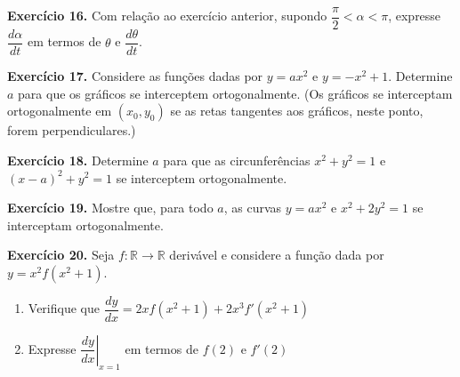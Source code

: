 \documentclass[12pt,a4paper]{article}
\begin{document}
\begin{center}
\end{center}

\vspace{0.5cm}
\noindent\textbf{Exercício 16.}
Com relação ao exercício anterior, supondo $\dfrac{\pi}{2} < \alpha < \pi$, expresse $\dfrac{d\alpha}{dt}$ em termos de $\theta$ e $\dfrac{d\theta}{dt}$.

\vspace{0.5cm}
\noindent\textbf{Exercício 17.}
Considere as funções dadas por $y = ax^2$ e $y = -x^2 + 1$. Determine $a$ para que os gráficos se interceptem ortogonalmente. (Os gráficos se interceptam ortogonalmente em $(x_0, y_0)$ se as retas tangentes aos gráficos, neste ponto, forem perpendiculares.)

\vspace{0.5cm}
\noindent\textbf{Exercício 18.}
Determine $a$ para que as circunferências $x^2 + y^2 = 1$ e $(x - a)^2 + y^2 = 1$ se interceptem ortogonalmente.

\vspace{0.5cm}
\noindent\textbf{Exercício 19.}
Mostre que, para todo $a$, as curvas $y = ax^2$ e $x^2 + 2y^2 = 1$ se interceptam ortogonalmente.

\vspace{0.5cm}
\noindent\textbf{Exercício 20.} Seja $f\colon \mathbb{R} \to \mathbb{R}$ derivável e considere a função dada por $y = x^2 f(x^2 + 1)$.
\begin{enumerate}
    \renewcommand{\theenumi}{\alph{enumi}}
    \renewcommand{\labelenumi}{\theenumi)}
    \item Verifique que $\dfrac{dy}{dx} = 2x f(x^2 + 1) + 2x^3 f'(x^2 + 1)$
    \item Expresse $\left.\dfrac{dy}{dx}\right|_{x = 1}$ em termos de $f(2)$ e $f'(2)$
\end{enumerate}
\end{document}
